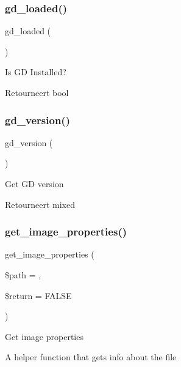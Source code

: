 \subsubsection{\texorpdfstring{gd\_loaded()}{gd\_loaded()}}
{\footnotesize\ttfamily gd\+\_\+loaded (\begin{DoxyParamCaption}{ }\end{DoxyParamCaption})}

Is GD Installed?

\begin{DoxyReturn}{Retourneert}
bool 
\end{DoxyReturn}
\mbox{\label{class_c_i___image__lib_a7d141f85d677d5e6db12020009569fde}} 
\subsubsection{\texorpdfstring{gd\_version()}{gd\_version()}}
{\footnotesize\ttfamily gd\+\_\+version (\begin{DoxyParamCaption}{ }\end{DoxyParamCaption})}

Get GD version

\begin{DoxyReturn}{Retourneert}
mixed 
\end{DoxyReturn}
\mbox{\label{class_c_i___image__lib_a91627ce4406f63c429ab13aab8f0e53c}} 
\subsubsection{\texorpdfstring{get\_image\_properties()}{get\_image\_properties()}}
{\footnotesize\ttfamily get\+\_\+image\+\_\+properties (\begin{DoxyParamCaption}\item[{}]{\$path = {\ttfamily \textquotesingle{}\textquotesingle{}},  }\item[{}]{\$return = {\ttfamily FALSE} }\end{DoxyParamCaption})}

Get image properties

A helper function that gets info about the file


